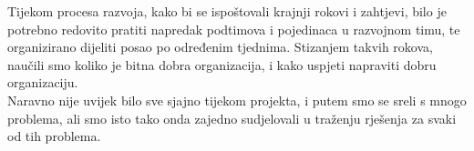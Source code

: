 	 Tijekom procesa razvoja, kako bi se ispoštovali krajnji rokovi i zahtjevi, bilo je potrebno redovito pratiti napredak podtimova i pojedinaca u razvojnom timu, te organizirano dijeliti posao po određenim tjednima. Stizanjem takvih rokova, naučili smo koliko je bitna dobra organizacija, i kako uspjeti napraviti dobru organizaciju.\\
	 
	 Naravno nije uvijek bilo sve sjajno tijekom projekta, i putem smo se sreli s mnogo problema, ali smo isto tako onda zajedno sudjelovali u traženju rješenja za svaki od tih problema. 
	 	
		
		\eject 